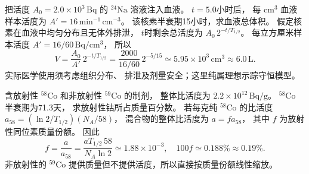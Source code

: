 把活度 $A_0=2.0\times10^3\,\mathrm{Bq}$
的 $\mathrm{^{24}Na}$ 溶液注入血液。
$t=5.0$小时后，
每 $\mathrm{cm^3}$ 血液样本活度为
$A'=16\,\mathrm{min^{-1}\,cm^{-3}}$。
该核素半衰期15小时，求血液总体积。
\exsolution
假定核素在血液中均匀分布且无体外排泄，
$t$时剩余总活度为
$A_0\,2^{-t/T_{1/2}}$。
每立方厘米样本活度
$A'=16/60\,\mathrm{Bq/cm^3}$，
所以
\[
 \boxed{V=\frac{A_0}{A'}\,2^{-t/T_{1/2}}
 =\frac{2000}{16/60}\,2^{-5/15}
 \simeq5.95\times10^3\,\mathrm{cm^3}
 \approx6.0\,\mathrm L}.
\]
\excheck 实际医学使用须考虑组织分布、
排泄及剂量安全；这里纯属理想示踪守恒模型。

含放射性 $\mathrm{^{58}Co}$ 和非放射性
$\mathrm{^{59}Co}$ 的制剂，
整体比活度为
$2.2\times10^{12}\,\mathrm{Bq/g}$。
$\mathrm{^{58}Co}$ 半衰期为71.3天，
求放射性钴所占质量百分数。
\exsolution
若每克纯 $\mathrm{^{58}Co}$ 的比活度
$a_{58}=(\ln2/T_{1/2})(N_A/58)$，
混合物的整体比活度为 $a=f a_{58}$，
其中 $f$ 为放射性同位素质量份额。
因此
\[
 \boxed{f=\frac{a}{a_{58}}
 =\frac{aT_{1/2}\,58}{N_A\ln2}
 \simeq1.88\times10^{-3}},
 \quad \boxed{100f\simeq0.188\%\approx0.19\%}.
\]
\excheck 非放射性的 $\mathrm{^{59}Co}$
提供质量但不提供活度，所以直接按质量份额线性缩放。
